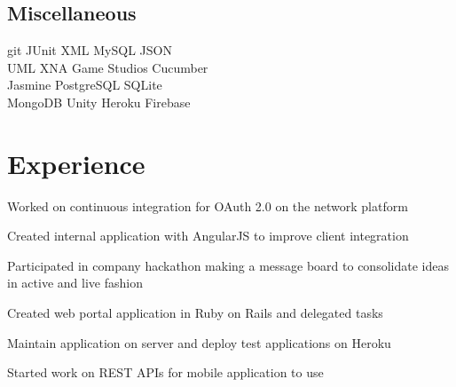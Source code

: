 \documentclass[]{deedy-resume-openfont}
\begin{document}
\begin{minipage}[t]{0.33\textwidth}
\subsection{Miscellaneous}
git \textbullet{} JUnit \textbullet{} XML \textbullet{} MySQL \textbullet{} JSON \\ UML
\textbullet{} XNA Game Studios \textbullet{} Cucumber \\ Jasmine \textbullet{} PostgreSQL
\textbullet{} SQLite \\ MongoDB \textbullet{} Unity \textbullet{} Heroku \textbullet{}
Firebase
\sectionsep

%
%

\end{minipage} 
\hfill
\begin{minipage}[t]{0.66\textwidth}


\section{Experience}

\vspace{\topsep} %
\begin{tightemize}
\item Worked on continuous integration for OAuth 2.0 on the network platform
\item Created internal application with AngularJS to improve client integration
\item Participated in company hackathon making a message board to consolidate ideas in active and live fashion
\end{tightemize}
\sectionsep

\begin{tightemize}
\item Created web portal application in Ruby on Rails and delegated tasks
\item Maintain application on server and deploy test applications on Heroku
\item Started work on REST APIs for mobile application to use
\end{tightemize}
\sectionsep


\end{minipage}
\end{document}
